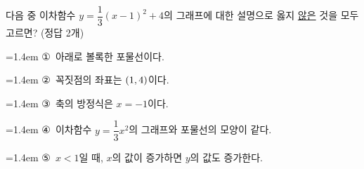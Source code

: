 다음 중 이차함수 $y=\dfrac{1}{3}(x-1)^2+4$의 그래프에 대한 설명으로 옳지 \underline{않은} 것을 모두 고르면? (정답 2개)
\par\medskip\par\noindent\hangindent=1.4em {\small ①}\ 아래로 볼록한 포물선이다.\par\noindent\hangindent=1.4em {\small ②}\ 꼭짓점의 좌표는 $(1{,}\mkern3mu 4)$이다.\par\noindent\hangindent=1.4em {\small ③}\ 축의 방정식은 $x=-1$이다.\par\noindent\hangindent=1.4em {\small ④}\ 이차함수 $y=\dfrac{1}{3}x^2$의 그래프와 포물선의 모양이 같다.\par\noindent\hangindent=1.4em {\small ⑤}\ $x<1$일 때, $x$의 값이 증가하면 $y$의 값도 증가한다.\par\medskip
